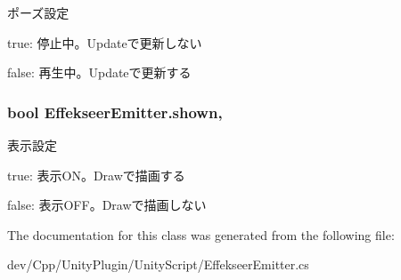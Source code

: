 ポーズ設定 

true\-: 停止中。\-Updateで更新しない

false\-: 再生中。\-Updateで更新する\hypertarget{class_effekseer_emitter_a8beed88f3cb7357c4eb088847a6d1fbc}{
\subsubsection[{shown}]{\setlength{\rightskip}{0pt plus 5cm}bool Effekseer\-Emitter.\-shown\hspace{0.3cm}{\ttfamily [get]}, {\ttfamily [set]}}}\label{class_effekseer_emitter_a8beed88f3cb7357c4eb088847a6d1fbc}


表示設定 

true\-: 表示\-O\-N。\-Drawで描画する

false\-: 表示\-O\-F\-F。\-Drawで描画しない

The documentation for this class was generated from the following file\-:\begin{DoxyCompactItemize}
\item 
dev/\-Cpp/\-Unity\-Plugin/\-Unity\-Script/Effekseer\-Emitter.\-cs\end{DoxyCompactItemize}
